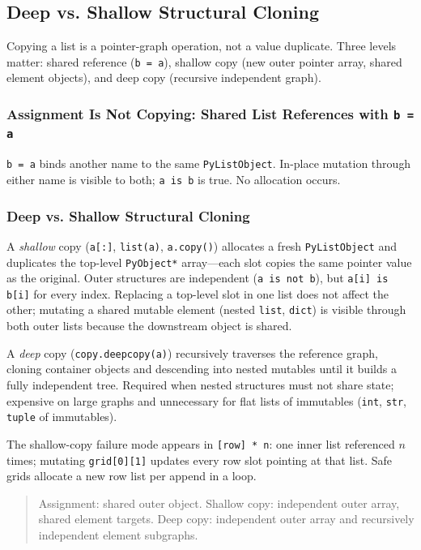 \subsection{Deep vs. Shallow Structural Cloning}

Copying a list is a pointer-graph operation, not a value duplicate. Three levels matter: shared reference (\texttt{b = a}), shallow copy (new outer pointer array, shared element objects), and deep copy (recursive independent graph).

\subsubsection{Assignment Is Not Copying: Shared List References with \texttt{b = a}}

\texttt{b = a} binds another name to the same \texttt{PyListObject}. In-place mutation through either name is visible to both; \texttt{a is b} is true. No allocation occurs.

\subsubsection{Deep vs. Shallow Structural Cloning}

A \emph{shallow} copy (\texttt{a[:]}, \texttt{list(a)}, \texttt{a.copy()}) allocates a fresh \texttt{PyListObject} and duplicates the top-level \texttt{PyObject*} array---each slot copies the same pointer value as the original. Outer structures are independent (\texttt{a is not b}), but \texttt{a[i] is b[i]} for every index. Replacing a top-level slot in one list does not affect the other; mutating a shared mutable element (nested \texttt{list}, \texttt{dict}) is visible through both outer lists because the downstream object is shared.

A \emph{deep} copy (\texttt{copy.deepcopy(a)}) recursively traverses the reference graph, cloning container objects and descending into nested mutables until it builds a fully independent tree. Required when nested structures must not share state; expensive on large graphs and unnecessary for flat lists of immutables (\texttt{int}, \texttt{str}, \texttt{tuple} of immutables).

The shallow-copy failure mode appears in \texttt{[row] * n}: one inner list referenced $n$ times; mutating \texttt{grid[0][1]} updates every row slot pointing at that list. Safe grids allocate a new row list per append in a loop.

\begin{quote}
Assignment: shared outer object. Shallow copy: independent outer array, shared element targets. Deep copy: independent outer array and recursively independent element subgraphs.
\end{quote}
